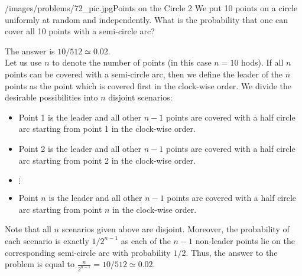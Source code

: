 \begin{problem}{/images/problems/72_pic.jpg}{Points on the Circle 2} We put 10  points on a circle uniformly at random and independently. What is the probability that one can cover all 10 points with a semi-circle arc?
\end{problem}

\begin{solution}
The answer is $10/512 \simeq 0.02$.\\[0.2cm]

Let us use $n$ to denote the number of points (in this case $n = 10$ hods). If all $n$ points can be covered with a semi-circle arc, then we define the leader of the $n$ points as the point which is covered first in the clock-wise order. We divide the desirable possibilities into $n$ disjoint scenarios:

\begin{itemize}
	\item Point 1 is the leader and all other $n-1$ points are covered with a half circle arc starting from point 1 in the clock-wise order.
	\item Point 2 is the leader and all other $n-1$ points are covered with a half circle arc starting from point 2 in the clock-wise order.
	\item $\vdots$
	\item Point $n$ is the leader and all other $n-1$ points are covered with a half circle arc starting from point $n$ in the clock-wise order.
\end{itemize}

Note that all $n$ scenarios given above are disjoint. Moreover, the probability of each scenario is exactly $1/2^{n-1}$ as each of the $n-1$ non-leader points lie on the corresponding semi-circle arc with probability $1/2$. Thus, the answer to the problem is equal to $\frac{n}{2^{n-1}} = 10/512 \simeq 0.02$.
\end{solution}

